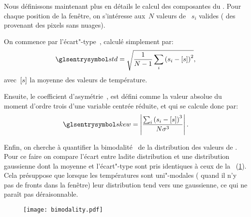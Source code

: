 Nous définissons maintenant plus en détails le calcul des composantes du .
Pour chaque position de la fenêtre, on s'intéresse aux~\(N\) valeurs de ~\(s_{i}\) valides ( des provenant des pixels sans nuages).

On commence par l'écart"-type~, calculé simplement par:
\begin{equation}
  \am{std} = \sqrt{\frac{1}{N-1} \sum_i \paren{s_i - \moy{s}}^2},
\end{equation}
avec~\(\left[s\right]\) la moyenne des valeurs de température.

Ensuite, le coefficient d'asymétrie~, est défini comme la valeur absolue du moment d'ordre trois d'une variable centrée réduite, et qui se calcule donc par:
\begin{equation}
  \am{skew} = \abs{\frac{\sum_i \paren{s_i - \moy{s}}^3} {N \sigma^3}}.
\end{equation}

Enfin, on cherche à quantifier la bimodalité~ de la distribution des valeurs de .
Pour ce faire on compare l'écart entre ladite distribution et une distribution gaussienne dont la moyenne et l'écart"-type sont pris identiques à ceux de la ~(\cref{fig:bimodality}).
Cela présuppose que lorsque les températures sont uni"-modales ( quand il n'y pas de fronts dans la fenêtre) leur distribution tend vers une gaussienne, ce qui ne paraît pas déraisonnable.

\begin{figure}
  \centering
  \texttt{[image: bimodality.pdf]}
  \label{fig:bimodality}
\end{figure}

